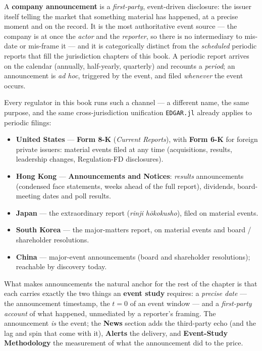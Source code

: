 \documentclass[11pt,a4paper]{report}
\begin{document}
A \textbf{company announcement} is a \emph{first-party}, event-driven disclosure: the issuer itself telling
the market that something material has happened, at a precise moment and on the record. It is the most
authoritative event source --- the company is at once the \emph{actor} and the \emph{reporter}, so there is
no intermediary to mis-date or mis-frame it --- and it is categorically distinct from the \emph{scheduled}
periodic reports that fill the jurisdiction chapters of this book. A periodic report arrives on the calendar
(annually, half-yearly, quarterly) and recounts a \emph{period}; an announcement is \emph{ad hoc}, triggered
by the event, and filed \emph{whenever} the event occurs.

Every regulator in this book runs such a channel --- a different name, the same purpose, and the same
cross-jurisdiction unification \texttt{EDGAR.jl} already applies to periodic filings:
\begin{itemize}
  \item \textbf{United States} --- \textbf{Form 8-K} (\emph{Current Reports}), with \textbf{Form 6-K} for
    foreign private issuers: material events filed at any time (acquisitions, results, leadership changes,
    Regulation-FD disclosures).
  \item \textbf{Hong Kong} --- \textbf{Announcements and Notices}: \emph{results} announcements (condensed
    face statements, weeks ahead of the full report), dividends, board-meeting dates and poll results.
  \item \textbf{Japan} --- the extraordinary report (\emph{rinji h\=okokusho}), filed on material events.
  \item \textbf{South Korea} --- the major-matters report, on material events and board / shareholder
    resolutions.
  \item \textbf{China} --- major-event announcements (board and shareholder resolutions); reachable by
    discovery today.
\end{itemize}

What makes announcements the natural anchor for the rest of the chapter is that each carries exactly the two
things an \textbf{event study} requires: a \emph{precise date} --- the announcement timestamp, the $t=0$ of
an event window --- and a \emph{first-party account} of what happened, unmediated by a reporter's framing.
The announcement \emph{is} the event; the \textbf{News} section adds the third-party echo (and the lag and
spin that come with it), \textbf{Alerts} the delivery, and \textbf{Event-Study Methodology} the measurement
of what the announcement did to the price.
\end{document}
